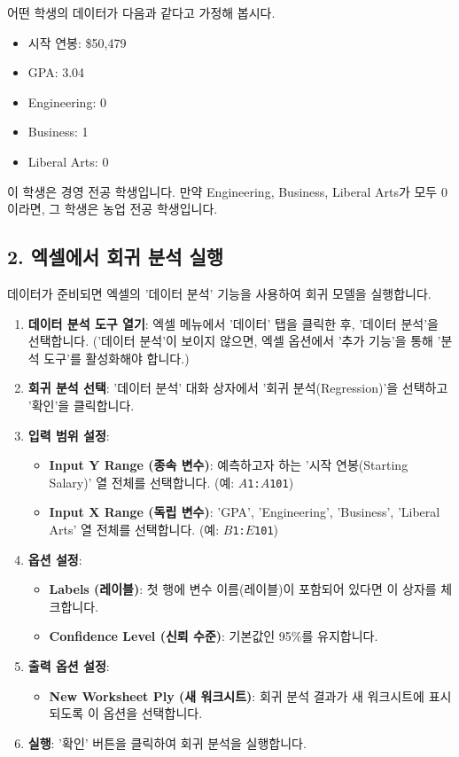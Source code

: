 \documentclass[11pt,a4paper]{article}
\theoremstyle{definition}
\begin{document}
\begin{tcolorbox}[example={더미 변수 코딩 예시}]
어떤 학생의 데이터가 다음과 같다고 가정해 봅시다.
\begin{itemize}
    \item 시작 연봉: \$50,479
    \item GPA: 3.04
    \item Engineering: 0
    \item Business: 1
    \item Liberal Arts: 0
\end{itemize}
이 학생은 경영 전공 학생입니다. 만약 Engineering, Business, Liberal Arts가 모두 0이라면, 그 학생은 농업 전공 학생입니다.
\end{tcolorbox}

\subsection{2. 엑셀에서 회귀 분석 실행}

데이터가 준비되면 엑셀의 '데이터 분석' 기능을 사용하여 회귀 모델을 실행합니다.

\begin{enumerate}
    \item \textbf{데이터 분석 도구 열기}: 엑셀 메뉴에서 '데이터' 탭을 클릭한 후, '데이터 분석'을 선택합니다. ('데이터 분석'이 보이지 않으면, 엑셀 옵션에서 '추가 기능'을 통해 '분석 도구'를 활성화해야 합니다.)
    \item \textbf{회귀 분석 선택}: '데이터 분석' 대화 상자에서 '회귀 분석(Regression)'을 선택하고 '확인'을 클릭합니다.
    \item \textbf{입력 범위 설정}:
    \begin{itemize}
        \item \textbf{Input Y Range (종속 변수)}: 예측하고자 하는 '시작 연봉(Starting Salary)' 열 전체를 선택합니다. (예: \texttt{$A$1:$A$101})
        \item \textbf{Input X Range (독립 변수)}: 'GPA', 'Engineering', 'Business', 'Liberal Arts' 열 전체를 선택합니다. (예: \texttt{$B$1:$E$101})
    \end{itemize}
    \item \textbf{옵션 설정}:
    \begin{itemize}
        \item \textbf{Labels (레이블)}: 첫 행에 변수 이름(레이블)이 포함되어 있다면 이 상자를 체크합니다.
        \item \textbf{Confidence Level (신뢰 수준)}: 기본값인 95\%를 유지합니다.
    \end{itemize}
    \item \textbf{출력 옵션 설정}:
    \begin{itemize}
        \item \textbf{New Worksheet Ply (새 워크시트)}: 회귀 분석 결과가 새 워크시트에 표시되도록 이 옵션을 선택합니다.
    \end{itemize}
    \item \textbf{실행}: '확인' 버튼을 클릭하여 회귀 분석을 실행합니다.
\end{enumerate}
\end{document}
